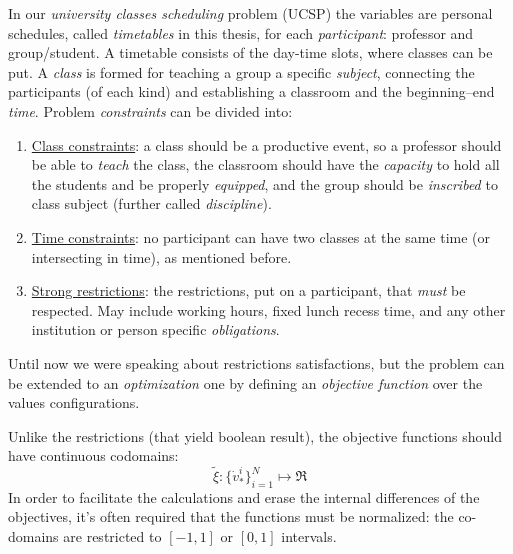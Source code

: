 \documentclass[ThesisDoc]{subfiles}
\begin{document}
  In our \emph{university classes scheduling} problem (UCSP) the variables
are personal schedules, called \emph{timetables} in this thesis,
for each \emph{participant}: professor and group/student.
  A timetable consists of the day-time slots, where classes can be put.
  A \emph{class} is formed for teaching a group a specific \emph{subject},
connecting the participants (of each kind) and establishing a classroom and
the beginning--end \emph{time}.
  Problem \emph{constraints} can be divided into:
\begin{enumerate}
  \item \underline{Class constraints}: a class should be a productive event, so
    a professor should be able to \emph{teach} the class, the classroom should
    have the \emph{capacity} to hold all the students and be properly \emph{equipped},
    and the group should be \emph{inscribed} to class subject
    (further called \emph{discipline}).
  \item \underline{Time constraints}: no participant can have two classes
    at the same time (or intersecting in time), as mentioned before.
  \item \underline{Strong restrictions}: the restrictions, put on a participant, that
    \emph{must} be respected. May include working hours, fixed lunch recess time,
    and any other institution or person specific \emph{obligations}.
\end{enumerate}

\bigskip

  Until now we were speaking about restrictions satisfactions, but the problem can
be extended to an \emph{optimization} one by defining an
\emph{objective function} over the values configurations.

  Unlike the restrictions (that yield boolean result), the objective functions
should have continuous codomains:
$$\tilde\xi : \{{\dot v}^i_\ast\}_{i=1}^N \mapsto \Re$$
  In order to facilitate the calculations and erase the internal differences of
the objectives, it's often required that the functions must be normalized:
the co-domains are restricted to $[-1,1]$ or $[0,1]$ intervals.
\end{document}
